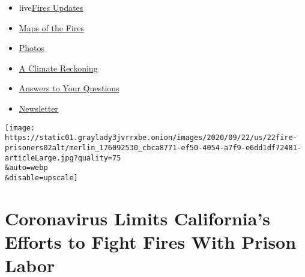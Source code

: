 \begin{itemize}
\tightlist
\item
  live\href{https://www.nytimes3xbfgragh.onion/2020/09/12/us/wildfires-live-updates.html?name=styln-california-wildfires\&region=TOP_BANNER\&block=storyline_menu_recirc\&action=click\&pgtype=Article\&impression_id=bf7937e1-f52c-11ea-84f0-cdc2bcc2aabe\&variant=undefined}{Fires
  Updates}
\item
  \href{https://www.nytimes3xbfgragh.onion/interactive/2020/us/fires-map-tracker.html?name=styln-california-wildfires\&region=TOP_BANNER\&block=storyline_menu_recirc\&action=click\&pgtype=Article\&impression_id=bf7937e2-f52c-11ea-84f0-cdc2bcc2aabe\&variant=undefined}{Maps
  of the Fires}
\item
  \href{https://www.nytimes3xbfgragh.onion/article/wildfires-photos-california-oregon-washington-state.html?name=styln-california-wildfires\&region=TOP_BANNER\&block=storyline_menu_recirc\&action=click\&pgtype=Article\&impression_id=bf795ef0-f52c-11ea-84f0-cdc2bcc2aabe\&variant=undefined}{Photos}
\item
  \href{https://www.nytimes3xbfgragh.onion/2020/09/10/us/climate-change-california-wildfires.html?name=styln-california-wildfires\&region=TOP_BANNER\&block=storyline_menu_recirc\&action=click\&pgtype=Article\&impression_id=bf795ef1-f52c-11ea-84f0-cdc2bcc2aabe\&variant=undefined}{A
  Climate Reckoning}
\item
  \href{https://www.nytimes3xbfgragh.onion/article/wildfires-california-oregon-washington.html?name=styln-california-wildfires\&region=TOP_BANNER\&block=storyline_menu_recirc\&action=click\&pgtype=Article\&impression_id=bf795ef2-f52c-11ea-84f0-cdc2bcc2aabe\&variant=undefined}{Answers
  to Your Questions}
\item
  \href{https://www.nytimes3xbfgragh.onion/2020/09/09/us/california-wildfires.html?name=styln-california-wildfires\&region=TOP_BANNER\&block=storyline_menu_recirc\&action=click\&pgtype=Article\&impression_id=bf795ef3-f52c-11ea-84f0-cdc2bcc2aabe\&variant=undefined}{Newsletter}
\end{itemize}

\texttt{[image: https://static01.graylady3jvrrxbe.onion/images/2020/09/22/us/22fire-prisoners02alt/merlin\_176092530\_cbca8771-ef50-4054-a7f9-e6dd1df72481-articleLarge.jpg?quality=75\\\&auto=webp\\\&disable=upscale]}

\hypertarget{coronavirus-limits-californias-efforts-to-fight-fires-with-prison-labor}{%
\section{Coronavirus Limits California's Efforts to Fight Fires With
Prison
Labor}\label{coronavirus-limits-californias-efforts-to-fight-fires-with-prison-labor}}

